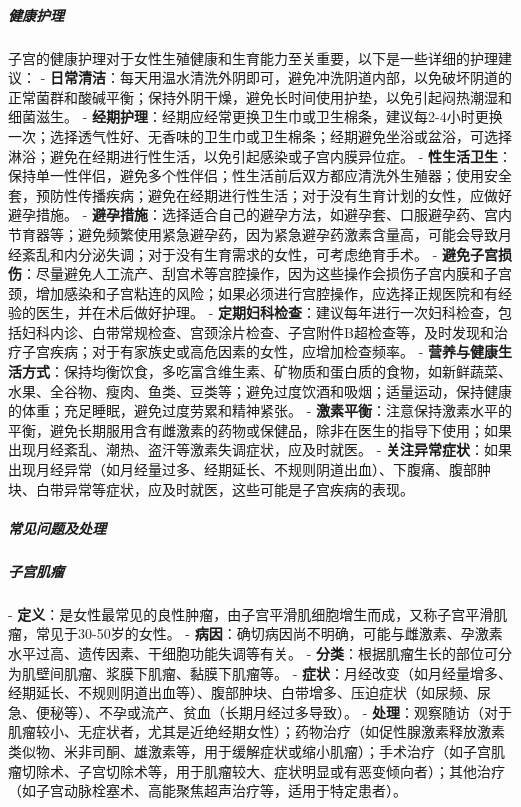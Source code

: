 \begin{enumerate}
\subparagraph{健康护理}
子宫的健康护理对于女性生殖健康和生育能力至关重要，以下是一些详细的护理建议：
- \textbf{日常清洁}：每天用温水清洗外阴即可，避免冲洗阴道内部，以免破坏阴道的正常菌群和酸碱平衡；保持外阴干燥，避免长时间使用护垫，以免引起闷热潮湿和细菌滋生。
- \textbf{经期护理}：经期应经常更换卫生巾或卫生棉条，建议每2-4小时更换一次；选择透气性好、无香味的卫生巾或卫生棉条；经期避免坐浴或盆浴，可选择淋浴；避免在经期进行性生活，以免引起感染或子宫内膜异位症。
- \textbf{性生活卫生}：保持单一性伴侣，避免多个性伴侣；性生活前后双方都应清洗外生殖器；使用安全套，预防性传播疾病；避免在经期进行性生活；对于没有生育计划的女性，应做好避孕措施。
- \textbf{避孕措施}：选择适合自己的避孕方法，如避孕套、口服避孕药、宫内节育器等；避免频繁使用紧急避孕药，因为紧急避孕药激素含量高，可能会导致月经紊乱和内分泌失调；对于没有生育需求的女性，可考虑绝育手术。
- \textbf{避免子宫损伤}：尽量避免人工流产、刮宫术等宫腔操作，因为这些操作会损伤子宫内膜和子宫颈，增加感染和子宫粘连的风险；如果必须进行宫腔操作，应选择正规医院和有经验的医生，并在术后做好护理。
- \textbf{定期妇科检查}：建议每年进行一次妇科检查，包括妇科内诊、白带常规检查、宫颈涂片检查、子宫附件B超检查等，及时发现和治疗子宫疾病；对于有家族史或高危因素的女性，应增加检查频率。
- \textbf{营养与健康生活方式}：保持均衡饮食，多吃富含维生素、矿物质和蛋白质的食物，如新鲜蔬菜、水果、全谷物、瘦肉、鱼类、豆类等；避免过度饮酒和吸烟；适量运动，保持健康的体重；充足睡眠，避免过度劳累和精神紧张。
- \textbf{激素平衡}：注意保持激素水平的平衡，避免长期服用含有雌激素的药物或保健品，除非在医生的指导下使用；如果出现月经紊乱、潮热、盗汗等激素失调症状，应及时就医。
- \textbf{关注异常症状}：如果出现月经异常（如月经量过多、经期延长、不规则阴道出血）、下腹痛、腹部肿块、白带异常等症状，应及时就医，这些可能是子宫疾病的表现。

\subparagraph{常见问题及处理}

\subparagraph{子宫肌瘤}
- \textbf{定义}：是女性最常见的良性肿瘤，由子宫平滑肌细胞增生而成，又称子宫平滑肌瘤，常见于30-50岁的女性。
- \textbf{病因}：确切病因尚不明确，可能与雌激素、孕激素水平过高、遗传因素、干细胞功能失调等有关。
- \textbf{分类}：根据肌瘤生长的部位可分为肌壁间肌瘤、浆膜下肌瘤、黏膜下肌瘤等。
- \textbf{症状}：月经改变（如月经量增多、经期延长、不规则阴道出血等）、腹部肿块、白带增多、压迫症状（如尿频、尿急、便秘等）、不孕或流产、贫血（长期月经过多导致）。
- \textbf{处理}：观察随访（对于肌瘤较小、无症状者，尤其是近绝经期女性）；药物治疗（如促性腺激素释放激素类似物、米非司酮、雄激素等，用于缓解症状或缩小肌瘤）；手术治疗（如子宫肌瘤切除术、子宫切除术等，用于肌瘤较大、症状明显或有恶变倾向者）；其他治疗（如子宫动脉栓塞术、高能聚焦超声治疗等，适用于特定患者）。


\end{enumerate}
